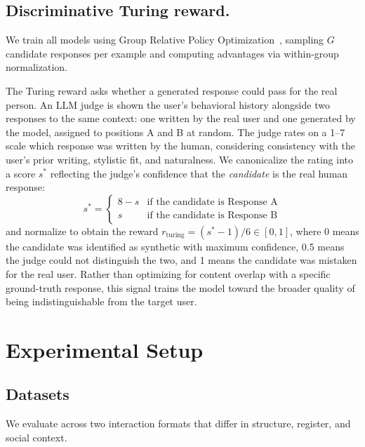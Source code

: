 \documentclass{article}
\begin{document}
\subsection{Discriminative Turing reward.}\label{sec:training}
 
We train all models using Group Relative Policy Optimization~\citep[GRPO;][]{shao2024deepseekmath}, sampling $G$ candidate responses per example and computing advantages via within-group normalization.
 
The Turing reward asks whether a generated response could pass for the real person. An LLM judge is shown the user's behavioral history alongside two responses to the same context: one written by the real user and one generated by the model, assigned to positions A and B at random. The judge rates on a 1--7 scale which response was written by the human, considering consistency with the user's prior writing, stylistic fit, and naturalness. We canonicalize the rating into a score $s^*$ reflecting the judge's confidence that the \emph{candidate} is the real human response:
\begin{equation}
  s^* = \begin{cases} 8 - s & \text{if the candidate is Response A} \\ s & \text{if the candidate is Response B} \end{cases}
\end{equation}
and normalize to obtain the reward $r_{\mathrm{turing}} = (s^* - 1) / 6 \in [0, 1]$, where 0 means the candidate was identified as synthetic with maximum confidence, 0.5 means the judge could not distinguish the two, and 1 means the candidate was mistaken for the real user. Rather than optimizing for content overlap with a specific ground-truth response, this signal trains the model toward the broader quality of being indistinguishable from the target user.
 
\section{Experimental Setup}
 
\subsection{Datasets}
 
We evaluate across two interaction formats that differ in structure, register, and social context.
 
\end{document}

